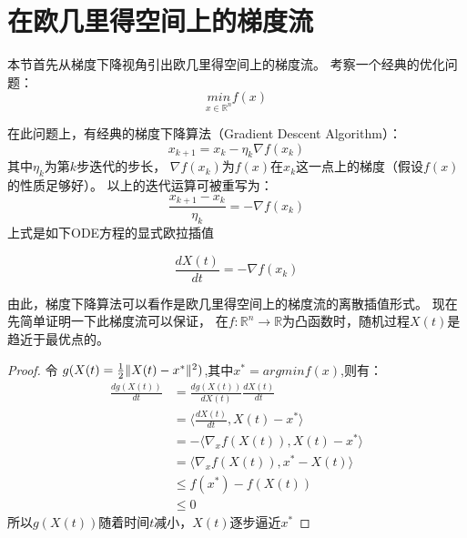 \section{在欧几里得空间上的梯度流}
本节首先从梯度下降视角引出欧几里得空间上的梯度流。
考察一个经典的优化问题：
$$ \underset{x \in \mathbb{R}^{n}}{min} f(x) $$
\par
在此问题上，有经典的梯度下降算法（Gradient Descent Algorithm）：
\begin{equation}
    x_{k+1} = x_{k} - \eta_{k} \nabla f(x_{k}) %
\end{equation}
其中$\eta_{k}$为第$k$步迭代的步长，
$\nabla f(x_{k})$为$f(x)$在$x_{k}$这一点上的梯度（假设$f(x)$的性质足够好）。
以上的迭代运算可被重写为：
$$ \frac{x_{k+1}-x_{k}}{\eta_{k}} =  -\nabla f(x_{k})$$
上式是如下ODE方程的显式欧拉插值

\begin{equation}
    \frac{dX(t)}{dt} =  -\nabla f(x_{k}) %
\end{equation}

由此，梯度下降算法可以看作是欧几里得空间上的梯度流的离散插值形式。
现在先简单证明一下此梯度流可以保证，
在$f:\mathbb{R}^{n}\rightarrow\mathbb{R}$为凸函数时，随机过程$X(t)$是趋近于最优点的。
\begin{proof}
    令 $     g(X(t)=\frac{1}{2}\Arrowvert X(t)-x^* \Arrowvert^2)$,其中$x^*=argminf(x)$,则有：
    \begin{equation}
        \begin{aligned}
            \frac{dg(X(t))}{dt}&=\frac{dg(X(t))}{dX(t)}\frac{dX(t)}{dt}\\
           &=\langle  \frac{dX(t)}{dt},X(t)-x^*  \rangle\\
           &= - \langle  \nabla_x f(X(t)),X(t)-x^*  \rangle\\
           &=  \langle  \nabla_x f(X(t)),x^*-X(t)  \rangle\\
           &\leqslant f(x^*)-f(X(t))\\
           &\leqslant 0
        \end{aligned}
    \end{equation}
    所以$g(X(t))$随着时间$t$减小，$X(t)$逐步逼近$x^*$
\end{proof}



